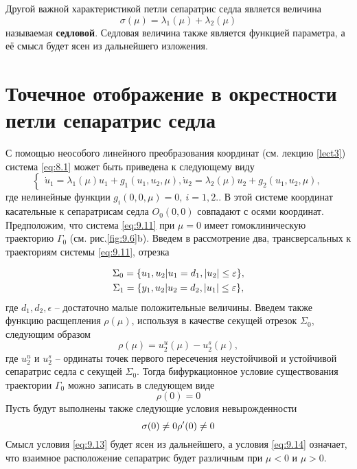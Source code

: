 Другой важной характеристикой петли сепаратрис седла является величина
\begin{equation}
        \label{eq:9.10}
        \sigma(\mu) = \lambda_1(\mu) + \lambda_2(\mu)
\end{equation}
называемая \textbf{седловой}. Седловая величина также является функцией параметра,
а её смысл будет ясен из дальнейшего изложения.

\section{Точечное отображение в окрестности петли сепаратрис седла}%
С помощью неособого линейного преобразования координат (см. лекцию \ref{lect3})
система \eqref{eq:8.1} может быть приведена к следующему виду
\begin{equation}
        \label{eq:9.11}
        \begin{cases}
                \dot u_1 = \lambda_1(\mu) u_1 + g_1(u_1,u_2,\mu),
                \dot u_2 = \lambda_2(\mu) u_2 + g_2(u_1,u_2,\mu),
        \end{cases}
\end{equation}
где нелинейные функции $g_i(0,0,\mu)=0,~ i =1,2.$. В этой системе координат 
касательные к сепаратрисам седла $O_0(0,0)$ совпадают с осями координат.
Предположим, что система \eqref{eq:9.11} при $\mu=0$ имеет гомоклиническую траекторию
$\Gamma_0$ (см. рис.\ref{fig:9.6}b). Введем в рассмотрение два, трансверсальных к траекториям системы \eqref{eq:9.11}, отрезка

\begin{gather}
        \Sigma_0 = \qty{u_1,u_2 | u_1 = d_1, |u_2| \leq \varepsilon}, \\
        \Sigma_1 = \qty{y_1,u_2 | u_2 = d_2, |u_1| \leq \varepsilon},
\end{gather}
где $d_1, d_2,\epsilon$ -- достаточно малые положительные величины. 
Введем также функцию расщепления $\rho(\mu)$, используя в качестве секущей отрезок $\Sigma_0$, 
следующим образом
\begin{equation}
        \label{eq:}
        \rho(\mu) = u_2^u(\mu) - u_2^s(\mu),
\end{equation}
где $u_2^u$ и $u_2^s$ -- ординаты точек первого пересечения неустойчивой и устойчивой сепаратрис седла
с секущей $\Sigma_0.$ Тогда бифуркационное условие существования траектории $\Gamma_0$ можно записать
в следующем виде
\begin{equation}
        \label{eq:9.12}
        \rho(0) =0
\end{equation}
Пусть будут выполнены также следующие условия невырожденности
\begin{equation}
        \label{eq:9.13}
        \sigma(0) \neq 0 \\
        \rho'(0) \neq 0
\end{equation}
Смысл условия \eqref{eq:9.13} будет ясен из дальнейшего, а условия \eqref{eq:9.14} означает, что
взаимное расположение сепаратрис будет различным при $\mu<0$ и $\mu>0$.

